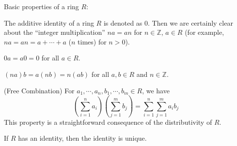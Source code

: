\documentclass{article}
\begin{document}
\begin{Rmk}{}
    Basic properties of a ring $R$:
    \begin{compactenum}
        \item \textcolor{Df}{The additive identity of a ring $R$ is denoted as $0$. Then we are certainly clear about the ``integer multiplication'' $na = an$ for $n\in\mathbb{Z}$, $a\in R$ (for example, $na = an = a + \cdots + a$ ($n$ times) for $n>0$).}
        \item \textcolor{Th}{$0a = a0 = 0$ for all $a \in R$.}
        \item \textcolor{Th}{$(na)b = a(nb) = n(ab)$ for all $a, b \in R$ and $n\in\mathbb{Z}$.}
        \item \textcolor{Th}{(Free Combination) For $a_1, \cdots, a_n, b_1, \cdots, b_m \in R$, we have
        $$ \left(\sum_{i=1}^{n} a_i\right) \left(\sum_{j=1}^{m} b_j\right) = \sum_{i=1}^{n} \sum_{j=1}^{m} a_i b_j $$
        } This property is a straightforward consequence of the distributivity of $R$.
        \item \textcolor{Th}{If $R$ has an identity, then the identity is unique.} 
    \end{compactenum}
\end{Rmk}
\end{document}
